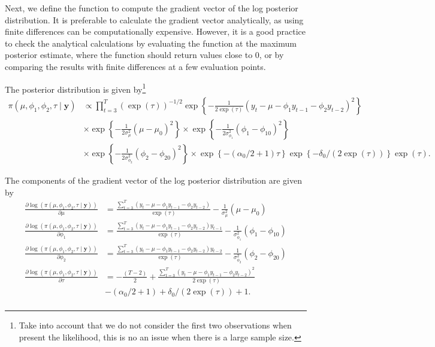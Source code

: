 Next, we define the function to compute the gradient vector of the log posterior distribution. It is preferable to calculate the gradient vector analytically, as using finite differences can be computationally expensive. However, it is a good practice to check the analytical calculations by evaluating the function at the maximum posterior estimate, where the function should return values close to 0, or by comparing the results with finite differences at a few evaluation points.

The posterior distribution is given by\footnote{Take into account that we do not consider the first two observations when present the likelihood, this is no an issue when there is a large sample size.}
\begin{align*}
	\pi(\mu,\phi_1,\phi_2,\tau\mid \bm{y})&\propto \prod_{t=3}^T(\exp(\tau))^{-1/2}\exp\left\{-\frac{1}{2\exp(\tau)}(y_t-\mu-\phi_1y_{t-1}-\phi_2y_{t-2})^2\right\}\\
	&\times\exp\left\{-\frac{1}{2\sigma^2_{\mu}}(\mu-\mu_0)^2\right\}\times\exp\left\{-\frac{1}{2\sigma^2_{\phi_1}}(\phi_1-\phi_{10})^2\right\}\\
	&\times\exp\left\{-\frac{1}{2\sigma^2_{\phi_2}}(\phi_2-\phi_{20})^2\right\}\times\exp\left\{-(\alpha_0/2+1)\tau\right\}\exp\left\{-\delta_0/(2\exp(\tau))\right\}\exp(\tau).
\end{align*} 

The components of the gradient vector of the log posterior distribution are given by
\begin{align*}
	\frac{\partial \log(\pi(\mu,\phi_1,\phi_2,\tau\mid \bm{y}))}{\partial\mu}&=\frac{\sum_{t=3}^T(y_t-\mu-\phi_1y_{t-1}-\phi_2y_{t-2})}{\exp(\tau)}-\frac{1}{\sigma_{\mu}^2}(\mu-\mu_0)\\
	\frac{\partial\log(\pi(\mu,\phi_1,\phi_2,\tau\mid \bm{y}))}{\partial\phi_1}&=\frac{\sum_{t=3}^T(y_t-\mu-\phi_1y_{t-1}-\phi_2y_{t-2})y_{t-1}}{\exp(\tau)}-\frac{1}{\sigma_{\phi_1}^2}(\phi_1-\phi_{10})\\
	\frac{\partial\log(\pi(\mu,\phi_1,\phi_2,\tau\mid \bm{y}))}{\partial\phi_2}&=\frac{\sum_{t=3}^T(y_t-\mu-\phi_1y_{t-1}-\phi_2y_{t-2})y_{t-2}}{\exp(\tau)}-\frac{1}{\sigma_{\phi_2}^2}(\phi_2-\phi_{20})\\	\frac{\partial\log(\pi(\mu,\phi_1,\phi_2,\tau\mid \bm{y}))}{\partial\tau}&=-\frac{(T-2)}{2}+\frac{\sum_{t=3}^T(y_t-\mu-\phi_1y_{t-1}-\phi_2y_{t-2})^2}{2\exp(\tau)}\\
	&-(\alpha_0/2+1)+\delta_0/(2\exp(\tau))+1.\\
\end{align*}

